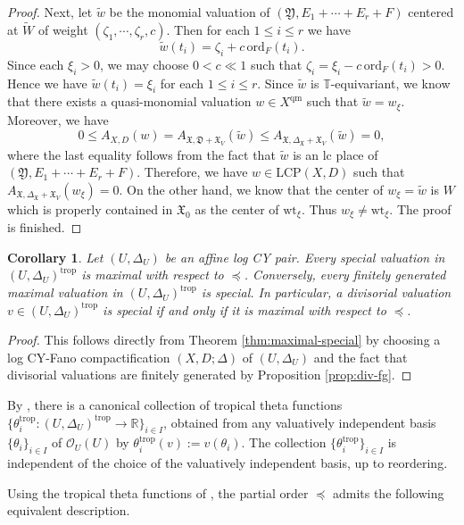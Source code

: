 \documentclass[reqno, 12pt]{amsart}
\newtheorem{cor}[prop]{Corollary}
\theoremstyle{definition}
\newcommand{\bR}{\mathbb{R}}
\newcommand{\bT}{\mathbb{T}}
\newcommand{\tw}{\widetilde{w}}
\newcommand{\tW}{\widetilde{W}}
\newcommand{\cO}{\mathcal{O}}
\newcommand{\ord}{\mathrm{ord}}
\newcommand{\wt}{\mathrm{wt}}
\newcommand{\trop}{\mathrm{trop}}
\newcommand{\fX}{\mathfrak{X}}
\newcommand{\fD}{\mathfrak{D}}
\newcommand{\fY}{\mathfrak{Y}}
\newcommand{\qm}{\mathrm{qm}}
\newcommand{\LCP}{\mathrm{LCP}}
\numberwithin{equation}{section}
\begin{document}
\begin{proof}
    Next, let $\tw$ be the monomial valuation of $(\fY, E_1+\cdots +E_r+F)$ centered at $\tW$ of weight $(\zeta_1,\cdots,\zeta_r, c)$. Then for each $1\leq i\leq r$ we have 
    \[
    \tw(t_i) = \zeta_i + c\, \ord_F(t_i). 
    \]
    Since each $\xi_i>0$, we may choose $0<c\ll 1$ such that $\zeta_i = \xi_i - c\, \ord_F(t_i)>0$. Hence we have $\tw(t_i) = \xi_i$ for each $1\leq i\leq r$. Since $\tw$ is $\bT$-equivariant, we know that there exists a quasi-monomial valuation $w\in X^{\qm}$ such that $\tw = w_{\xi}$. Moreover, we have 
    \[
    0\leq A_{X,D}(w) = A_{\fX, \fD + \fX_V}(\tw) \leq A_{\fX, \Delta_{\fX} + \fX_V}(\tw) = 0,
    \]
    where the last equality follows from the fact that $\tw$ is an lc place of $(\fY, E_1+\cdots + E_r + F)$. Therefore, we have $w\in \LCP(X,D)$ such that $A_{\fX, \Delta_{\fX}+ \fX_V}(w_{\xi})=0$. On the other hand, we know that the center of $w_{\xi}= \tw$ is $W$ which is properly contained in $\fX_0$ as the center of $\wt_{\xi}$. Thus $w_{\xi}\neq \wt_{\xi}$. The proof is finished. 
\end{proof}

\begin{cor}\label{cor:maximal-affineCY}
Let $(U,\Delta_U)$ be an affine log CY pair. Every special valuation in $(U,\Delta_U)^{\trop}$ is maximal with respect to $\preceq$. Conversely, every finitely generated maximal valuation in $(U,\Delta_U)^{\trop}$ is special.
In particular, a divisorial valuation $v\in (U,\Delta_U)^{\trop}$ is special if and only if it is maximal with respect to $\preceq$.
\end{cor}

\begin{proof}
    This follows directly from Theorem \ref{thm:maximal-special} by choosing a log CY-Fano compactification $(X,D;\Delta)$ of $(U,\Delta_U)$ and the fact that divisorial valuations are finitely generated by Proposition \ref{prop:div-fg}.
\end{proof}

By \cite[Lemma~3.20 and Theorem~3.22]{BL26}, there is a
canonical collection of tropical theta functions
$\{\theta_i^{\trop}:(U,\Delta_U)^{\trop}\to\bR\}_{i\in I}$,
obtained from any valuatively independent basis
$\{\theta_i\}_{i\in I}$ of $\cO_U(U)$ by
$\theta_i^{\trop}(v):=v(\theta_i)$.
The collection $\{\theta_i^{\trop}\}_{i\in I}$ is independent of the choice of the
valuatively independent basis, up to reordering.

Using the tropical theta functions of \cite{BL26}, the partial
order $\preceq$ admits the following equivalent description.
\end{document}
